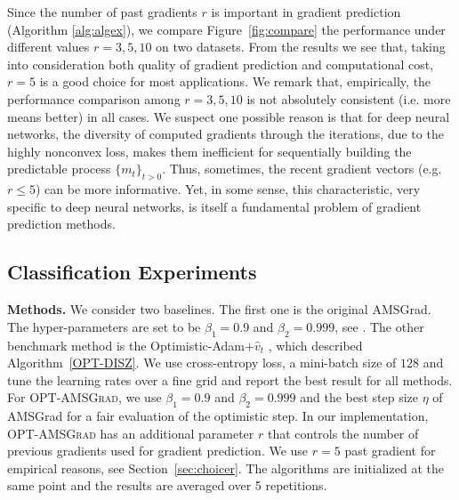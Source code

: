 \documentclass[wcp]{jmlr}
\begin{document}
Since the number of past gradients $r$ is important in gradient prediction (Algorithm \ref{alg:algex}), we compare Figure~\ref{fig:compare} the performance under different values $r=3,5,10$ on two datasets. 
From the results we see that, taking into consideration both quality of gradient prediction and computational cost, $r=5$ is a good choice for most applications. 
We remark that, empirically, the performance comparison among $r=3,5,10$ is not absolutely consistent (i.e. more means better) in all cases. We suspect one possible reason is that for deep neural networks, the diversity of computed gradients through the iterations, due to the highly nonconvex loss, makes them inefficient for sequentially building the predictable process $\{m_t\}_{t>0}$. 
Thus, sometimes, the recent gradient vectors (e.g. $r\leq 5$) can be more informative. 
Yet, in some sense, this characteristic, very specific to deep neural networks, is itself a fundamental problem of gradient prediction methods. 


\subsection{Classification Experiments}


\textbf{Methods.}
We consider two baselines. The first one is the original AMSGrad. 
The hyper-parameters are set to be $\beta_1 = 0.9$ and $\beta_2 = 0.999$, see \citep{RKK18}. 
The other benchmark method is the Optimistic-Adam$+\hat{v}_t$ \citep{DISZ18}, which described Algorithm~\ref{OPT-DISZ}. 
We use cross-entropy loss, a mini-batch size of $128$ and tune the learning rates over a fine grid and report the best result for all methods.
For \textsc{OPT-AMSGrad}, we use $\beta_1 = 0.9$ and $\beta_2 = 0.999$ and the best step size $\eta$ of AMSGrad for a fair evaluation of the optimistic step. In our implementation, \textsc{OPT-AMSGrad} has an additional parameter $r$ that controls the number of previous gradients used for gradient prediction. 
We use $r=5$ past gradient for empirical reasons, see Section~\ref{sec:choicer}.
The algorithms are initialized at the same point and the results are averaged over 5 repetitions.
\end{document}
